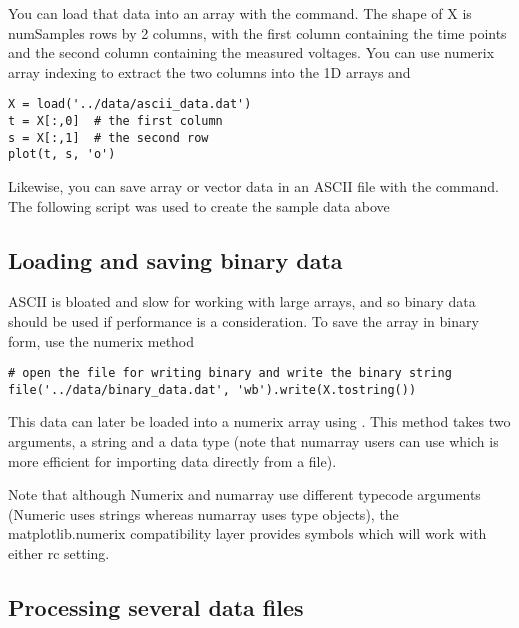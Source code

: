 \documentclass[twoside]{book}
\begin{document}
\noindent You can load that data into an array  with the 
command.  The shape of X is numSamples rows by 2 columns, with the
first column containing the time points and the second column
containing the measured voltages.  You can use numerix array indexing
to extract the two columns into the 1D arrays  and 

\begin{lstlisting}
X = load('../data/ascii_data.dat')
t = X[:,0]  # the first column
s = X[:,1]  # the second row
plot(t, s, 'o')
\end{lstlisting}

Likewise, you can save array or vector data in an ASCII file
with the  command.  The following script was used to create
the sample data above



\subsection{Loading and saving binary data}
\label{sec:binary_data}

ASCII is bloated and slow for working with large arrays, and so binary
data should be used if performance is a consideration.  To save the
array  in binary form, use the numerix  method

\begin{lstlisting}
# open the file for writing binary and write the binary string
file('../data/binary_data.dat', 'wb').write(X.tostring())
\end{lstlisting}

\noindent This data can later be loaded into a numerix array using
.  This method takes two arguments, a string and a
data type (note that numarray users can use  which is
more efficient for importing data directly from a file).  



\noindent Note that although Numerix and numarray use different
typecode arguments (Numeric uses strings whereas numarray uses type
objects), the matplotlib.numerix compatibility layer provides symbols
which will work with either  rc setting.

\subsection{Processing several data files}
\label{sec:multiple_files}
\end{document}
